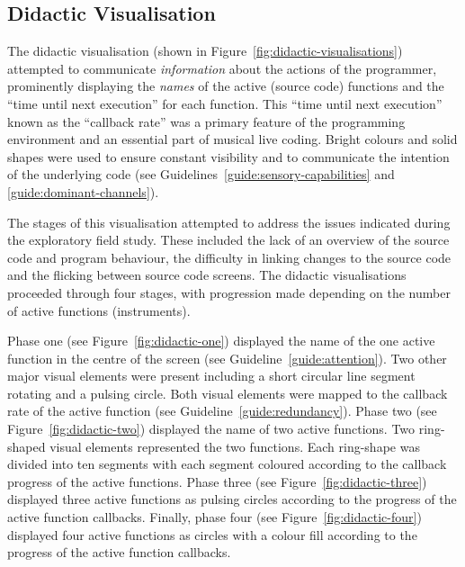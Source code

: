 

\subsection{Didactic Visualisation}
\label{sec:didactic-visualisation}

The didactic visualisation (shown in Figure~\ref{fig:didactic-visualisations}) attempted to communicate \emph{information} about the actions of the programmer, prominently displaying the \emph{names} of the active (source code) functions and the ``time until next execution'' for each function. This ``time until next execution'' known as the ``callback rate'' was a primary feature of the programming environment and an essential part of musical live coding. Bright colours and solid shapes were used to ensure constant visibility and to communicate the intention of the underlying code (see Guidelines~\ref{guide:sensory-capabilities} and \ref{guide:dominant-channels}). 

The stages of this visualisation attempted to address the issues indicated during the exploratory field study. These included the lack of an overview of the source code and program behaviour, the difficulty in linking changes to the source code and the flicking between source code screens. The didactic visualisations proceeded through four stages, with progression made depending on the number of active functions (instruments).

Phase one (see Figure~\ref{fig:didactic-one}) displayed the name of the one active function in the centre of the screen (see Guideline~\ref{guide:attention}). Two other major visual elements were present including a short circular line segment rotating and a pulsing circle. Both visual elements were mapped to the callback rate of the active function (see Guideline~\ref{guide:redundancy}). Phase two (see Figure~\ref{fig:didactic-two}) displayed the name of two active functions. Two ring-shaped visual elements represented the two functions. Each ring-shape was divided into ten segments with each segment coloured according to the callback progress of the active functions. Phase three (see Figure~\ref{fig:didactic-three}) displayed three active functions as pulsing circles according to the progress of the active function callbacks. Finally, phase four (see Figure~\ref{fig:didactic-four}) displayed four active functions as circles with a colour fill according to the progress of the active function callbacks.



